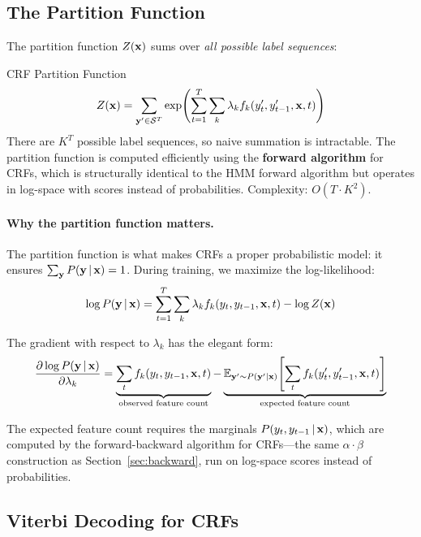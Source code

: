 \subsection{The Partition Function}

The partition function $Z(\mathbf{x})$ sums over \emph{all possible label sequences}:

\begin{mathresult}{CRF Partition Function}
\begin{equation}
Z(\mathbf{x}) = \sum_{\mathbf{y}' \in \mathcal{S}^T}
\exp\!\left(\sum_{t=1}^{T} \sum_{k} \lambda_k f_k(y'_t, y'_{t-1}, \mathbf{x}, t)\right)
\label{eq:partition}
\end{equation}
There are $K^T$ possible label sequences, so naive summation is intractable.
The partition function is computed efficiently using the \textbf{forward
algorithm} for CRFs, which is structurally identical to the HMM forward
algorithm but operates in log-space with scores instead of probabilities.
Complexity: $O(T \cdot K^2)$.
\end{mathresult}

\paragraph{Why the partition function matters.}
The partition function is what makes CRFs a proper probabilistic model: it
ensures $\sum_{\mathbf{y}} P(\mathbf{y} \,|\, \mathbf{x}) = 1$.  During training, we maximize the
log-likelihood:
\begin{equation}
\log P(\mathbf{y} \,|\, \mathbf{x}) = \sum_{t=1}^{T} \sum_{k} \lambda_k f_k(y_t, y_{t-1}, \mathbf{x}, t) - \log Z(\mathbf{x})
\label{eq:crf_loglik}
\end{equation}

The gradient with respect to $\lambda_k$ has the elegant form:
\begin{equation}
\frac{\partial \log P(\mathbf{y} \,|\, \mathbf{x})}{\partial \lambda_k}
= \underbrace{\sum_t f_k(y_t, y_{t-1}, \mathbf{x}, t)}_{\text{observed feature count}}
- \underbrace{\operatorname{\mathbb{E}}_{\mathbf{y}' \sim P(\mathbf{y}' | \mathbf{x})}\!\left[\sum_t f_k(y'_t, y'_{t-1}, \mathbf{x}, t)\right]}_{\text{expected feature count}}
\label{eq:crf_gradient}
\end{equation}

The expected feature count requires the marginals $P(y_t, y_{t-1} \,|\, \mathbf{x})$,
which are computed by the forward-backward algorithm for CRFs---the same
$\alpha \cdot \beta$ construction as Section~\ref{sec:backward}, run on
log-space scores instead of probabilities.

\subsection{Viterbi Decoding for CRFs}

